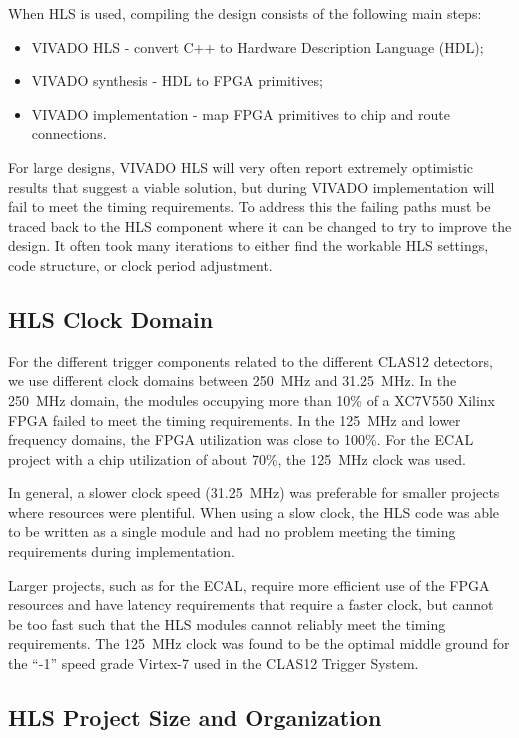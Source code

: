 When HLS is used, compiling the design consists of the following main steps:

\begin{itemize}
	\item VIVADO HLS - convert C++ to Hardware Description Language (HDL);
	\item VIVADO synthesis - HDL to FPGA primitives;
	\item VIVADO implementation - map FPGA primitives to chip and route connections.
\end{itemize}

For large designs, VIVADO HLS will very often report extremely optimistic results that suggest a viable
solution, but during VIVADO implementation will fail to meet the timing requirements. To address this the
failing paths must be traced back to the HLS component where it can be changed to try to improve the design.
It often took many iterations to either find the workable HLS settings, code structure, or clock period
adjustment.

\subsection{HLS Clock Domain}

For the different trigger components related to the different CLAS12 detectors, we use different clock
domains between 250~MHz and 31.25~MHz. In the 250~MHz domain, the modules occupying more than
10\% of a XC7V550 Xilinx FPGA failed to meet the timing requirements. In the 125~MHz and lower frequency
domains, the FPGA utilization was close to 100\%. For the ECAL project with a chip utilization of about 70\%,
the 125~MHz clock was used.

In general, a slower clock speed (31.25~MHz) was preferable for smaller projects where resources were
plentiful. When using a slow clock, the HLS code was able to be written as a single module and had no problem
meeting the timing requirements during implementation.

Larger projects, such as for the ECAL, require more efficient use of the FPGA resources and have latency
requirements that require a faster clock, but cannot be too fast such that the HLS modules cannot reliably
meet the timing requirements. The 125~MHz clock was found to be the optimal middle ground for the ``-1''
speed grade Virtex-7 used in the CLAS12 Trigger System.

\subsection{HLS Project Size and Organization}

